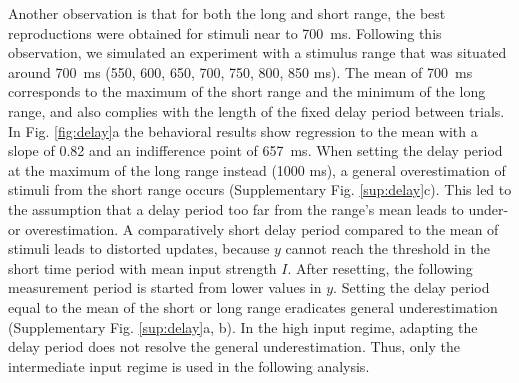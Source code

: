 \documentclass[10pt]{article}
\begin{document}
Another observation is that for both the long and short range, the best reproductions were obtained for stimuli near to 700~ms.
Following this observation, we simulated an experiment with a stimulus range that was situated around 700~ms (550, 600, 650, 700, 750, 800, 850 ms). 
The mean of 700~ms corresponds to the maximum of the short range and the minimum of the long range, and also complies with the length of the fixed delay period between trials.
In Fig. \ref{fig:delay}a the behavioral results show regression to the mean with a slope of 0.82 and an indifference point of 657~ms.
When setting the delay period at the maximum of the long range instead (1000 ms), a general overestimation of stimuli from the short range occurs (Supplementary Fig. \ref{sup:delay}c).
This led to the assumption that a delay period too far from the range's mean leads to under- or overestimation. 
A comparatively short delay period compared to the mean of stimuli leads to distorted updates, because $y$ cannot reach the threshold in the short time period with mean input strength $I$. 
After resetting, the following measurement period is started from lower values in $y$. 
Setting the delay period equal to the mean of the short or long range 
eradicates general underestimation (Supplementary Fig. \ref{sup:delay}a, b).
In the high input regime, adapting the delay period does not resolve the general underestimation. Thus, only the intermediate input regime is used in the following analysis.
\end{document}
